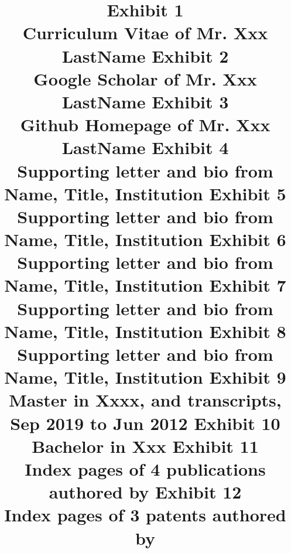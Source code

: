 \documentclass[11pt]{article}
\begin{document}
\pagebreak





\newcommand{\ip}[1]{}
\newcommand{\ex}[2]{
\title{\textbf{\huge{Exhibit #1}}\\
\vspace{3em}
\Large{#2}
}
\author{}
\maketitle
}


\ex{1}{Curriculum Vitae of Mr. Xxx LastName}
  
\ex{2}{Google Scholar of Mr. Xxx LastName}

\ex{3}{Github Homepage of Mr. Xxx LastName}
 

\ex{4}{Supporting letter and bio from Name, Title, Institution}
\ip{rl/letter_template.pdf}

\ex{5}{Supporting letter and bio from Name, Title, Institution}

\ex{6}{Supporting letter and bio from Name, Title, Institution}

\ex{7}{Supporting letter and bio from Name, Title, Institution}

\ex{8}{Supporting letter and bio from Name, Title, Institution}


\ex{9}{\drs Master in Xxxx, and transcripts, Sep 2019 to Jun 2012}

\ex{10}{\drs Bachelor in Xxx}


\ex{11}{Index pages of 4 publications authored by \dr}


\ex{12}{Index pages of 3 patents authored by \dr}






\pagebreak
\end{document}
